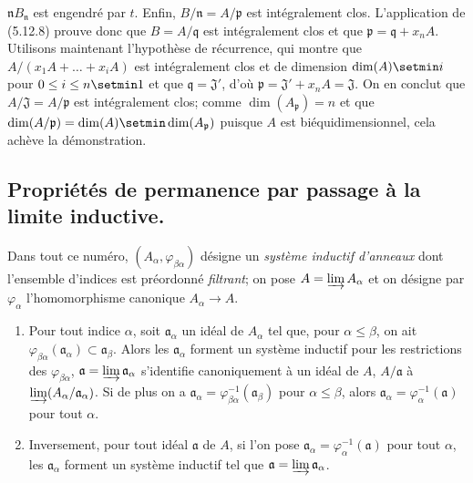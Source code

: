 $\mathfrak nB_{\mathfrak n}$ est engendré par $t$. Enfin,
$B/\mathfrak n=A/\mathfrak p$ est intégralement clos. L'application de
(5.12.8) prouve donc que $B=A/\mathfrak q$ est intégralement clos et que
$\mathfrak p=\mathfrak q+x_nA$. Utilisons maintenant l'hypothèse de récurrence,
qui montre que $A/(x_1A+\ldots+x_iA)$ est intégralement clos et de dimension
$\dim(A)\setmin i$ pour $0\leq i\leq n\setmin 1$ et que $\mathfrak q=\mathfrak J'$, d'où
$\mathfrak p=\mathfrak J'+x_nA=\mathfrak J$. On en conclut que
$A/\mathfrak J=A/\mathfrak p$ est intégralement clos; comme
$\dim(A_{\mathfrak p})=n$ et que
$\dim(A/\mathfrak p)=\dim(A)\setmin\dim(A_{\mathfrak p})$ puisque $A$ est
biéquidimensionnel, cela achève la démonstration.

\subsection{Propriétés de permanence par passage à la limite inductive.}

Dans tout ce numéro, $(A_\alpha,\varphi_{\beta\alpha})$ désigne un \emph{système
inductif d'anneaux} dont l'ensemble d'indices est préordonné \emph{filtrant}; on pose
$A=\varinjlim A_\alpha$ et on désigne par $\varphi_\alpha$ l'homomorphisme
canonique $A_\alpha\to A$.

\begin{proposition}[5.13.1]
\label{IV.2.s5.13.1-fr}
\begin{enumerate}
\item[\textup{(i)}] Pour tout indice $\alpha$, soit $\mathfrak a_\alpha$ un idéal de
$A_\alpha$ tel que, pour $\alpha\leq\beta$, on ait
$\varphi_{\beta\alpha}(\mathfrak a_\alpha)\subset\mathfrak a_\beta$. Alors
les $\mathfrak a_\alpha$ forment un système inductif pour les restrictions des
$\varphi_{\beta\alpha}$, $\mathfrak a=\varinjlim\mathfrak a_\alpha$
s'identifie canoniquement à un idéal de $A$, $A/\mathfrak a$ à
$\varinjlim(A_\alpha/\mathfrak a_\alpha)$. Si de plus on a
$\mathfrak a_\alpha=\varphi_{\beta\alpha}^{-1}(\mathfrak a_\beta)$ pour
$\alpha\leq\beta$, alors
$\mathfrak a_\alpha=\varphi_\alpha^{-1}(\mathfrak a)$ pour tout $\alpha$.
\item[\textup{(ii)}] Inversement, pour tout idéal $\mathfrak a$ de $A$, si l'on pose
$\mathfrak a_\alpha=\varphi_\alpha^{-1}(\mathfrak a)$ pour tout $\alpha$, les
$\mathfrak a_\alpha$ forment un système inductif tel que
$\mathfrak a=\varinjlim\mathfrak a_\alpha$.
\end{enumerate}
\end{proposition}

